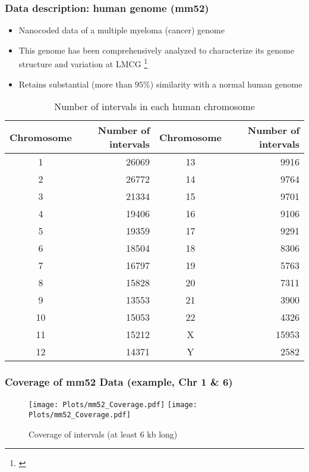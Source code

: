 \documentclass[10pt,dvipsnames,table]{beamer}
\begin{document}
\begin{frame}
\frametitle{Data description: human genome (mm52)}
\begin{itemize}
\footnotesize
\item Nanocoded data of a multiple myeloma (cancer) genome
\item This genome has been comprehensively analyzed to characterize its genome structure and variation at LMCG \footnote{\cite{Gupta_etal_2015_PNAS}}
\item Retains substantial (more than $95\%$) similarity with a normal human genome
\end{itemize}

\begin{table}[H]
\footnotesize
\centering
\begin{tabular}{c | r || c | r}
  \hline
  \hline
  Chromosome & Number of intervals & Chromosome & Number of intervals \\ 
  \hline
  1 & 26069  & 13 & 9916 \\
  2 & 26772  & 14 & 9764 \\
  3 & 21334  & 15 & 9701 \\
  4 & 19406  & 16 & 9106 \\
  5 & 19359  & 17 & 9291 \\
  6 & 18504  & 18 & 8306 \\
  7 & 16797  & 19 & 5763 \\
  8 & 15828  & 20 & 7311 \\
  9 & 13553  & 21 & 3900 \\
  10 & 15053  & 22 & 4326 \\
  11 & 15212  & X & 15953 \\
  12 & 14371  & Y & 2582 \\
  \hline
  \hline
\end{tabular}
\caption{Number of intervals in each human chromosome}
\label{tab:mm52intervals}
\end{table}

\end{frame}

\begin{frame}
\frametitle{Coverage of mm52 Data (example, Chr 1 \& 6)}
\begin{figure}[H]
\begin{center}
\texttt{[image: Plots/mm52\_Coverage.pdf]}
\texttt{[image: Plots/mm52\_Coverage.pdf]}
\end{center}
\caption{Coverage of intervals (at least 6 kb long)}
\label{fig:Coverage_mm1}
\end{figure}

\end{frame}
\end{document}
